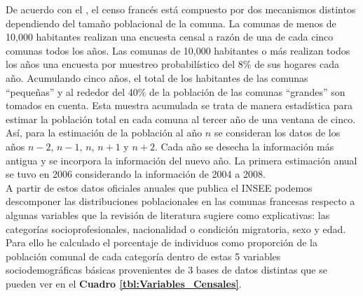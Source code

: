 De acuerdo con el \textcite{FichaCenso}, el censo francés está compuesto por dos mecanismos distintos dependiendo del tamaño poblacional de la comuna. La comunas de menos de 10,000 habitantes realizan una encuesta censal a razón de una de cada cinco comunas todos los años. Las comunas de 10,000 habitantes o más realizan todos los años una encuesta por muestreo probabilístico del 8\% de sus hogares cada año. Acumulando cinco años, el total de los habitantes de las comunas ``pequeñas'' y al rededor del 40\% de la población de las comunas ``grandes'' son tomados en cuenta. Esta muestra acumulada se trata de manera estadística para estimar la población total en cada comuna al tercer año de una ventana de cinco. Así, para la estimación de la población al año $n$ se consideran los datos de los años $n-2$, $n-1$, $n$, $n+1$ y $n+2$. Cada año se desecha la información más antigua y se incorpora la información del nuevo año.  La primera estimación anual se tuvo en 2006 considerando la información de 2004 a 2008.\\

A partir de estos datos oficiales anuales que publica el INSEE podemos descomponer las distribuciones poblacionales en las comunas francesas respecto a algunas variables que la revisión de literatura sugiere como explicativas: las categorías socioprofesionales, nacionalidad o condición migratoria, sexo y edad. Para ello he calculado el porcentaje de individuos como proporción de la población comunal de cada categoría dentro de estas 5 variables sociodemográficas básicas provenientes de 3 bases de datos distintas que se pueden ver en el \textbf{Cuadro \ref{tbl:Variables_Censales}}.\\ 


